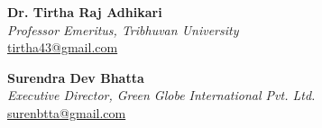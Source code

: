 \documentclass[a4paper, 09pt]{extarticle}
\begin{document}
\vspace{10pt}

\noindent
\textbf{Dr. Tirtha Raj Adhikari}\\[2pt]
\textit{Professor Emeritus, Tribhuvan University}\\
\href{mailto:tirtha43@gmail.com}{tirtha43@gmail.com}

\vspace{5pt}

\noindent
\textbf{Surendra Dev Bhatta}\\[2pt]
\textit{Executive Director, Green Globe International Pvt. Ltd.}\\
\href{mailto:surenbtta@gmail.com}{surenbtta@gmail.com}
\end{document}
